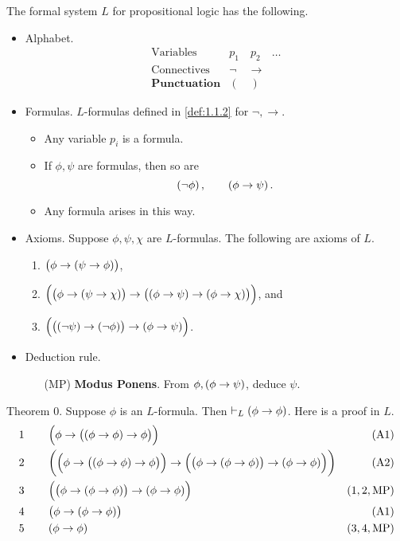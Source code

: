 \begin{definition}
The formal system $ L $ for propositional logic has the following.
\begin{itemize}
\item Alphabet.
$$
\begin{array}{ll}
\text{Variables} & p_1 \quad p_2 \quad \dots \\
\text{Connectives} & \neg \quad \rightarrow \\
\textbf{Punctuation} & ( \quad )
\end{array}
$$
\item Formulas. $ L $-formulas defined in \ref{def:1.1.2} for $ \neg, \rightarrow $.
\begin{itemize}
\item Any variable $ p_i $ is a formula.
\item If $ \phi, \psi $ are formulas, then so are
$$ \notb{\phi}, \qquad \impb{\phi}{\psi}. $$
\item Any formula arises in this way.
\end{itemize}
\item Axioms. Suppose $ \phi, \psi, \chi $ are $ L $-formulas. The following are axioms of $ L $.
\begin{enumerate}[label=(A\arabic*)]
\item $ \impb{\phi}{\impb{\psi}{\phi}} $,
\item $ \impb{\impb{\phi}{\impb{\psi}{\chi}}}{\impb{\impb{\phi}{\psi}}{\impb{\phi}{\chi}}} $, and
\item $ \impb{\impb{\notb{\psi}}{\notb{\phi}}}{\impb{\phi}{\psi}} $.
\end{enumerate}
\item Deduction rule.
\begin{itemize}
\item[(MP)] \textbf{Modus Ponens}. From $ \phi, \impb{\phi}{\psi} $, deduce $ \psi $.
\end{itemize}
\end{itemize}
\end{definition}

\begin{example}
\label{eg:1.2.3}
Theorem $ 0 $. Suppose $ \phi $ is an $ L $-formula. Then $ \vdash_L \impb{\phi}{\phi} $. Here is a proof in $ L $.
\begin{align*}
1 \qquad & \impb{\phi}{\impb{\impb{\phi}{\phi}}{\phi}} & \br{\text{A1}} \\
2 \qquad & \impb{\impb{\phi}{\impb{\impb{\phi}{\phi}}{\phi}}}{\impb{\impb{\phi}{\impb{\phi}{\phi}}}{\impb{\phi}{\phi}}} & \br{\text{A2}} \\
3 \qquad & \impb{\impb{\phi}{\impb{\phi}{\phi}}}{\impb{\phi}{\phi}} & \br{1, 2, \text{MP}} \\
4 \qquad & \impb{\phi}{\impb{\phi}{\phi}} & \br{\text{A1}} \\
5 \qquad & \impb{\phi}{\phi} & \br{3, 4, \text{MP}}
\end{align*}
\end{example}

